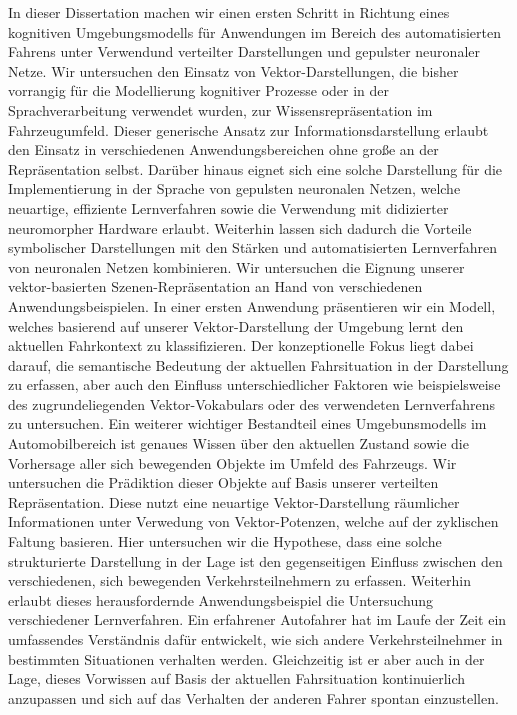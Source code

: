 In dieser Dissertation machen wir einen ersten Schritt in Richtung eines kognitiven Umgebungsmodells f\"ur Anwendungen im Bereich des automatisierten Fahrens unter Verwendund verteilter Darstellungen und gepulster neuronaler Netze.
Wir untersuchen den Einsatz von Vektor-Darstellungen, die bisher vorrangig f\"ur die Modellierung kognitiver Prozesse oder in der Sprachverarbeitung verwendet wurden, zur Wissensrepr\"asentation im Fahrzeugumfeld.
Dieser generische Ansatz zur Informationsdarstellung erlaubt den Einsatz in verschiedenen Anwendungsbereichen ohne gro{\ss}e an der Repr\"asentation selbst.
Dar\"uber hinaus eignet sich eine solche Darstellung f\"ur die Implementierung in der Sprache von gepulsten neuronalen Netzen, welche neuartige, effiziente Lernverfahren sowie die Verwendung mit didizierter neuromorpher Hardware erlaubt.
Weiterhin lassen sich dadurch die Vorteile symbolischer Darstellungen mit den St\"arken und automatisierten Lernverfahren von neuronalen Netzen kombinieren.
Wir untersuchen die Eignung unserer vektor-basierten Szenen-Repr\"asentation an Hand von verschiedenen Anwendungsbeispielen.
In einer ersten Anwendung pr\"asentieren wir ein Modell, welches basierend auf unserer Vektor-Darstellung der Umgebung lernt den aktuellen Fahrkontext zu klassifizieren.
Der konzeptionelle Fokus liegt dabei darauf, die semantische Bedeutung der aktuellen Fahrsituation in der Darstellung zu erfassen, aber auch den Einfluss unterschiedlicher Faktoren wie beispielsweise des zugrundeliegenden Vektor-Vokabulars oder des verwendeten Lernverfahrens zu untersuchen.
Ein weiterer wichtiger Bestandteil eines Umgebunsmodells im Automobilbereich ist genaues Wissen \"uber den aktuellen Zustand sowie die Vorhersage aller sich bewegenden Objekte im Umfeld des Fahrzeugs.
Wir untersuchen die Pr\"adiktion dieser Objekte auf Basis unserer verteilten Repr\"asentation.
Diese nutzt eine neuartige Vektor-Darstellung r\"aumlicher Informationen unter Verwedung von Vektor-Potenzen, welche auf der zyklischen Faltung basieren.
Hier untersuchen wir die Hypothese, dass eine solche strukturierte Darstellung in der Lage ist den gegenseitigen Einfluss zwischen den verschiedenen, sich bewegenden Verkehrsteilnehmern zu erfassen.
Weiterhin erlaubt dieses herausfordernde Anwendungsbeispiel die Untersuchung verschiedener Lernverfahren.
Ein erfahrener Autofahrer hat im Laufe der Zeit ein umfassendes Verst\"andnis daf\"ur entwickelt, wie sich andere Verkehrsteilnehmer in bestimmten Situationen verhalten werden.
Gleichzeitig ist er aber auch in der Lage, dieses Vorwissen auf Basis der aktuellen Fahrsituation kontinuierlich anzupassen und sich auf das Verhalten der anderen Fahrer spontan einzustellen.
